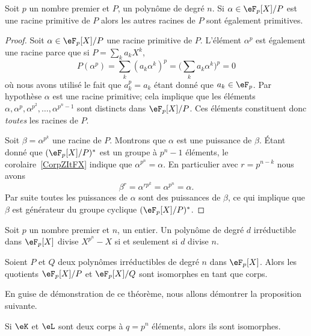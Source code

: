 \begin{lemma}       \label{Lembcerei}
    Soit \( p\) un nombre premier et \( P\), un polynôme de degré \( n\). Si \( \alpha\in \eF_p[X]/P\) est une racine primitive de \( P\) alors les autres racines de \(P\) sont également primitives.
\end{lemma}

\begin{proof}
    Soit \( \alpha\in \eF_p[X]/P\) une racine primitive de \( P\). L'élément \( \alpha^p\) est également une racine parce que si \( P=\sum_ka_kX^k\),
    \begin{equation}
        P(\alpha^p)=\sum_k(a_k\alpha^k)^p=\big( \sum_ka_k\alpha^k \big)^p=0
    \end{equation}
    où nous avons utilisé le fait que \( a_k^p=a_k\) étant donné que \( a_k\in\eF_p\). Par hypothèse \( \alpha\) est une racine primitive; cela implique que les éléments \( \alpha,\alpha^p,\alpha^{p^2},\ldots,\alpha^{p^n-1}\) sont distincts dans \( \eF_p[X]/P\). Ces éléments constituent donc \emph{toutes} les racines de \( P\).

    Soit \( \beta=\alpha^{p^k}\) une racine de \( P\). Montrons que \( \alpha\) est une puissance de \( \beta\). Étant donné que \( (\eF_p[X]/P)^*\) est un groupe à \( p^n-1\) éléments, le corolaire~\ref{CorpZItFX} indique que \( \alpha^{p^n}=\alpha\). En particulier avec \( r=p^{n-k}\) nous avons
    \begin{equation}
        \beta^r=\alpha^{rp^k}=\alpha^{p^n}=\alpha.
    \end{equation}
    Par suite toutes les puissances de \( \alpha\) sont des puissances de \( \beta\), ce qui implique que \( \beta\) est générateur du groupe cyclique \( (\eF_p[X]/P)^*\).
\end{proof}

\begin{lemma}       \label{LemkzWjse}
    Soit \( p\) un nombre premier et \( n\), un entier. Un polynôme de degré \( d\) irréductible dans \( \eF_p[X]\) divise \( X^{p^n}-X\) si et seulement si \( d\) divise \( n\).
\end{lemma}

\begin{theorem}
    Soient \( P\) et \( Q\) deux polynômes irréductibles de degré \( n\) dans \( \eF_p[X]\). Alors les quotients \( \eF_p[X]/P\) et \( \eF_p[X]/Q\) sont isomorphes en tant que corps.
\end{theorem}
En guise de démonstration de ce théorème, nous allons démontrer la proposition suivante.
\begin{proposition}      \label{PropCRPjZsp}
    Si \( \eK\) et \( \eL\) sont deux corps à \( q=p^n\) éléments, alors ils sont isomorphes.
\end{proposition}

